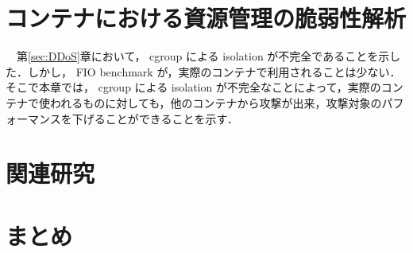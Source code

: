 \documentclass[graduation-thesis]{jsarticle}
\begin{document}
\clearpage
\section{コンテナにおける資源管理の脆弱性解析}
　第\ref{sec:DDoS}章において， cgroup による isolation が不完全であることを示した．しかし， FIO benchmark が，実際のコンテナで利用されることは少ない．そこで本章では， cgroup による isolation が不完全なことによって，実際のコンテナで使われるものに対しても，他のコンテナから攻撃が出来，攻撃対象のパフォーマンスを下げることができることを示す．
\label{sec:analysis}

\clearpage
\section{関連研究}
\label{sec:relative}

\clearpage
\section{まとめ}
\label{sec:conclusion}
\end{document}
